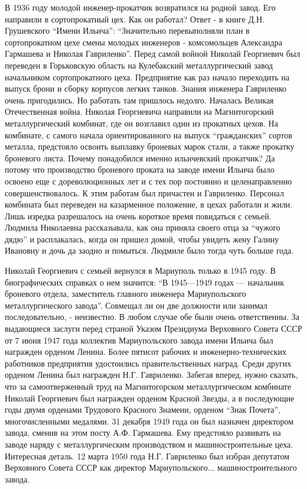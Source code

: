 В 1936 году молодой инженер-прокатчик возвратился на родной завод. Его
направили в сортопрокатный цех. Как он работал? Ответ - в книге Д.Н.
Грушевского \enquote{Имени Ильича}: \enquote{Значительно перевыполняли план в сортопрокатном
цехе смены молодых инженеров - комсомольцев Александра Гармашева и Николая
Гавриленко}. Перед самой войной Николай Георгиевич был переведен в Горьковскую
область на Кулебакский металлургический завод начальником сортопрокатного цеха.
Предприятие как раз начало переходить на выпуск брони и сборку корпусов легких
танков. Знания инженера Гавриленко очень пригодились. Но работать там пришлось
недолго. Началась Великая Отечественная война. Николая Георгиевича направили на
Магнитогорский металлургический комбинат, где он возглавил один из прокатных
цехов. На комбинате, с самого начала ориентированного  на выпуск \enquote{гражданских}
сортов металла, предстояло освоить  выплавку броневых марок стали, а также
прокатку броневого листа. Почему понадобился именно ильичевский прокатчик? Да
потому что производство броневого проката на заводе имени Ильича было освоено
еще с дореволюционных лет и с тех пор постоянно и целенаправленно
совершенствовалось. К этим работам был причастен и Гавриленко. Персонал
комбината был переведен на казарменное положение, в цехах работали и жили. Лишь
изредка разрешалось на очень короткое время повидаться с семьей. Людмила
Николаевна рассказывала, как она приняла своего отца за \enquote{чужого дядю} и
расплакалась, когда он пришел домой, чтобы увидеть жену Галину Ивановну и дочь
да заодно и помыться. Людмиле было тогда чуть больше года.

Николай Георгиевич с семьей вернулся в Мариуполь только в 1945 году. В
биографических справках о нем значится: \enquote{В 1945—1949 годах — начальник
броневого отдела, заместитель главного инженера Мариупольского
металлургического завода}. Совмещал ли он две должности или занимал
последовательно,  -  неизвестно. В любом случае обе были очень ответственны. За
выдающиеся заслуги перед страной Указом Президиума Верховного Совета СССР от 7
июня 1947 года коллектив Мариупольского завода имени Ильича был награжден
орденом Ленина. Более пятисот рабочих и инженерно-технических работников
предприятия  удостоились правительственных наград. Среди других орденом Ленина
был награжден Н.Г. Гавриленко. Забегая вперед, нужно сказать, что за
самоотверженный труд на Магнитогорском металлургическом комбинате Николай
Георгиевич был награжден орденом Красной Звезды, а в последующие годы  двумя
орденами Трудового Красного Знамени, орденом \enquote{Знак Почета}, многочисленными
медалями. 31 декабря 1949 года он был назначен директором завода, сменив на
этом посту А.Ф. Гармашева. Ему  предстояло  развивать на заводе наряду с
металлургическим производством и машиностроительные цеха. Интересная деталь. 12
марта 1950 года Н.Г. Гавриленко был избран депутатом Верховного Совета СССР как
директор Мариупольского... машиностроительного завода. 

